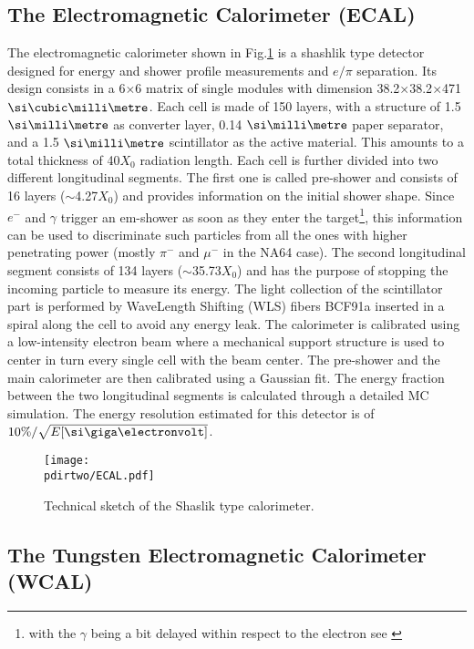 \subsection{The Electromagnetic Calorimeter (ECAL)}
\label{ch2:sec:detectors-ecal}

The electromagnetic calorimeter shown in Fig.\ref{fig:ecal-sketch} is a shashlik type detector designed for energy and shower profile measurements and $e/\pi$ separation. Its design consists in a 6$\times$6 matrix of single modules with dimension 38.2$\times$38.2$\times$471 $\mmc$. Each cell is made of 150 layers, with a structure of 1.5 $\mmi$ as converter layer, 0.14 $\mmi$ paper separator, and a 1.5 $\mmi$ scintillator as the active material. This amounts to a total thickness of 40$X_0$ radiation length. Each cell is further divided into two different longitudinal segments. The first one is called pre-shower and consists of 16 layers ($\sim$4.27$X_0$) and provides information on the initial shower shape. Since $e^-$ and $\gamma$ trigger an em-shower as soon as they enter the target\footnote{with the $\gamma$ being a bit delayed within respect to the electron see \cite{Bichsel:2002cf}}, this information can be used to discriminate such particles from all the ones with higher penetrating power (mostly $\pi^-$ and $\mu^-$ in the NA64 case). The second longitudinal segment consists of 134 layers ($\sim$35.73$X_0$) and has the purpose of stopping the incoming particle to measure its energy. The light collection of the scintillator part is performed by WaveLength Shifting (WLS) fibers BCF91a \cite{wls-fibers} inserted in a spiral along the cell to avoid any energy leak. The calorimeter is calibrated using a low-intensity electron beam where a mechanical support structure is used to center in turn every single cell with the beam center. The pre-shower and the main calorimeter are then calibrated using a Gaussian fit. The energy fraction between the two longitudinal segments is calculated through a detailed MC simulation. The energy resolution estimated for this detector is of $10\% / \sqrt{E[\gev]}$.

\begin{figure}[bth!]
\centering
\texttt{[image: \\pdirtwo/ECAL.pdf]}
\caption[ECAL sketch]{Technical sketch of the Shaslik type calorimeter.}
\label{fig:ecal-sketch}
\end{figure}

\subsection{The Tungsten Electromagnetic Calorimeter (WCAL)}

